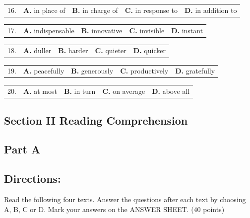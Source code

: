 \documentclass[UTF8,11pt]{ctexart}
\begin{document}
\noindent\begin{tabularx}{\linewidth}{@{}lXXXX@{}}16. & \textbf{A.} in place of & \textbf{B.} in charge of & \textbf{C.} in response to & \textbf{D.} in addition to\\\end{tabularx}\par

\noindent\begin{tabularx}{\linewidth}{@{}lXXXX@{}}17. & \textbf{A.} indispensable & \textbf{B.} innovative & \textbf{C.} invisible & \textbf{D.} instant\\\end{tabularx}\par

\noindent\begin{tabularx}{\linewidth}{@{}lXXXX@{}}18. & \textbf{A.} duller & \textbf{B.} harder & \textbf{C.} quieter & \textbf{D.} quicker\\\end{tabularx}\par

\noindent\begin{tabularx}{\linewidth}{@{}lXXXX@{}}19. & \textbf{A.} peacefully & \textbf{B.} generously & \textbf{C.} productively & \textbf{D.} gratefully\\\end{tabularx}\par

\noindent\begin{tabularx}{\linewidth}{@{}lXXXX@{}}20. & \textbf{A.} at most & \textbf{B.} in turn & \textbf{C.} on average & \textbf{D.} above all\\\end{tabularx}\par

\subsection*{\textbf{Section II Reading Comprehension}}


\subsection*{\textbf{Part A}}


\subsection*{\textbf{Directions:}}


Read the following four texts. Answer the questions after each text by choosing A, B, C or D. Mark your answers on the ANSWER SHEET. (40 points)
\end{document}
